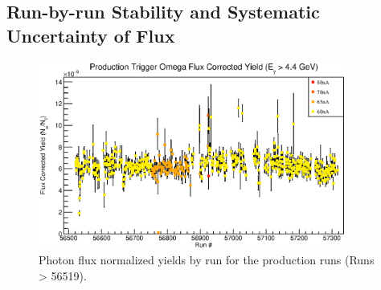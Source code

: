 \subsection{\label{sec:flux.runbyrun}Run-by-run Stability and Systematic Uncertainty of Flux}
\begin{figure}[h]
\begin{center}
 \includegraphics[width=0.9\textwidth]{figures/gflux/gflux_runstability_omega.eps}
  \caption{Photon flux normalized yields by run for the production runs (Runs > 56519).}
  \label{gfluxbyrun}
  \end{center}
\end{figure}

\FloatBarrier
